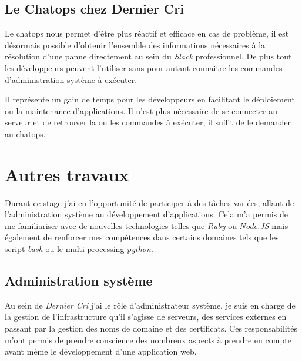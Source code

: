 \newpage

\subsection{Le Chatops chez Dernier
Cri}\label{le-chatops-chez-dernier-cri}

\bigskip

Le chatops nous permet d'être plus réactif et efficace en cas de
problème, il est désormais possible d'obtenir l'ensemble des
informations nécessaires à la résolution d'une panne directement au sein
du \emph{Slack} professionnel. De plus tout les développeurs peuvent
l'utiliser sans pour autant connaitre les commandes d'administration
système à exécuter.

\bigskip

Il représente un gain de temps pour les développeurs en facilitant le
déploiement ou la maintenance d'applications. Il n'est plus nécessaire
de se connecter au serveur et de retrouver la ou les commandes à
exécuter, il suffit de le demander au chatops.

\newpage

\section{Autres travaux}\label{autres-travaux}

\bigskip

Durant ce stage j'ai eu l'opportunité de participer à des tâches
variées, allant de l'administration système au développement
d'applications. Cela m'a permis de me familiariser avec de nouvelles
technologies telles que \emph{Ruby} ou \emph{Node.JS} mais également de
renforcer mes compétences dans certains domaines tels que les script
\emph{bash} ou le multi-processing \emph{python}.

\subsection{Administration système}\label{administration-systuxe8me}

\bigskip

Au sein de \emph{Dernier Cri} j'ai le rôle d'administrateur système, je
suis en charge de la gestion de l'infrastructure qu'il s'agisse de
serveurs, des services externes en passant par la gestion des noms de
domaine et des certificats. Ces responsabilités m'ont permis de prendre
conscience des nombreux aspects à prendre en compte avant même le
développement d'une application web.

